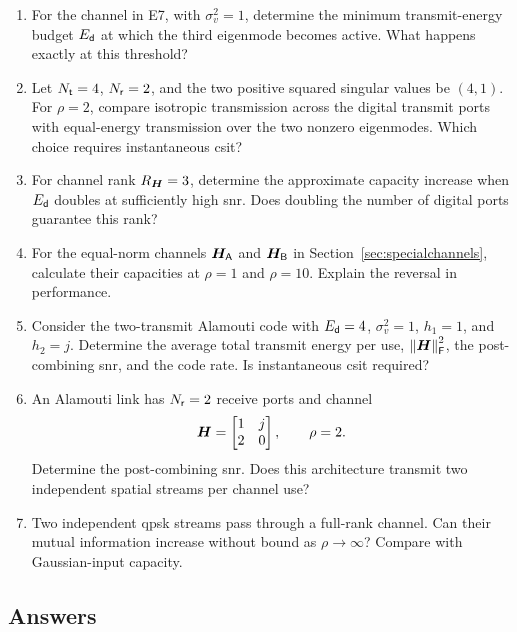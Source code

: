 \begin{enumerate}[label=\textbf{E\arabic*.}]
	\item For the channel in E7, with $\sigma_v^2=1$,
	determine the minimum transmit-energy budget $E_{\mathsf{d}}$
	at which the third eigenmode becomes active.
	What happens exactly at this threshold?
	
	\item Let $N_{\mathsf{t}}=4$, $N_{\mathsf{r}}=2$, and the two positive
	squared singular values be $(4,1)$.
	For $\rho=2$, compare isotropic transmission
	across the digital transmit ports with equal-energy
	transmission over the two nonzero eigenmodes.
	Which choice requires instantaneous \ac{csit}?
	
	\item For channel rank $R_{\bm{H}}=3$, determine the
	approximate capacity increase when $E_{\mathsf{d}}$ doubles
	at sufficiently high \ac{snr}.
	Does doubling the number of digital ports
	guarantee this rank?
	
	\item For the equal-norm channels
	$\bm{H}_{\mathsf A}$ and $\bm{H}_{\mathsf B}$
	in Section~\ref{sec:specialchannels},
	calculate their capacities at $\rho=1$ and
	$\rho=10$. Explain the reversal in performance.
	
	\item Consider the two-transmit Alamouti code with
	$E_{\mathsf{d}}=4$, $\sigma_v^2=1$,
	$h_1=1$, and $h_2=j$.
	Determine the average total transmit energy per use,
	$\left\|\bm{H}\right\|_{\mathsf{F}}^2$, the post-combining \ac{snr},
	and the code rate.
	Is instantaneous \ac{csit} required?
	
	\item An Alamouti link has $N_{\mathsf{r}}=2$ receive ports
	and channel
	\begin{equation*}
		\bm{H}=
		\begin{bmatrix}
			1&j\\
			2&0
		\end{bmatrix},
		\qquad \rho=2.
	\end{equation*}
	Determine the post-combining \ac{snr}.
	Does this architecture transmit two independent
	spatial streams per channel use?
	
	\item Two independent \ac{qpsk} streams pass through
	a full-rank channel. Can their mutual information
	increase without bound as $\rho\to\infty$?
	Compare with Gaussian-input capacity.
	
\end{enumerate}

\clearpage
\subsection*{Answers}


